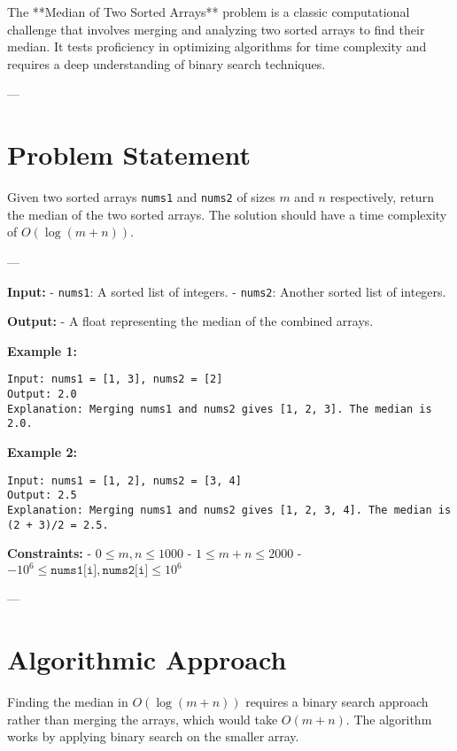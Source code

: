 
\label{problem:Median_of_Two_Sorted_Arrays}

The **Median of Two Sorted Arrays** problem is a classic computational challenge that involves merging and analyzing two sorted arrays to find their median. It tests proficiency in optimizing algorithms for time complexity and requires a deep understanding of binary search techniques.

---

\section*{Problem Statement}
Given two sorted arrays \texttt{nums1} and \texttt{nums2} of sizes \(m\) and \(n\) respectively, return the median of the two sorted arrays. The solution should have a time complexity of \(O(\log(m + n))\).

---

\textbf{Input:}
- \texttt{nums1}: A sorted list of integers.
- \texttt{nums2}: Another sorted list of integers.

\textbf{Output:}
- A float representing the median of the combined arrays.

\textbf{Example 1:}
\begin{verbatim}
Input: nums1 = [1, 3], nums2 = [2]
Output: 2.0
Explanation: Merging nums1 and nums2 gives [1, 2, 3]. The median is 2.0.
\end{verbatim}

\textbf{Example 2:}
\begin{verbatim}
Input: nums1 = [1, 2], nums2 = [3, 4]
Output: 2.5
Explanation: Merging nums1 and nums2 gives [1, 2, 3, 4]. The median is (2 + 3)/2 = 2.5.
\end{verbatim}

\textbf{Constraints:}
- \(0 \leq m, n \leq 1000\)
- \(1 \leq m + n \leq 2000\)
- \(-10^6 \leq \texttt{nums1[i]}, \texttt{nums2[i]} \leq 10^6\)

---

\section*{Algorithmic Approach}

Finding the median in \(O(\log(m + n))\) requires a binary search approach rather than merging the arrays, which would take \(O(m + n)\). The algorithm works by applying binary search on the smaller array.

